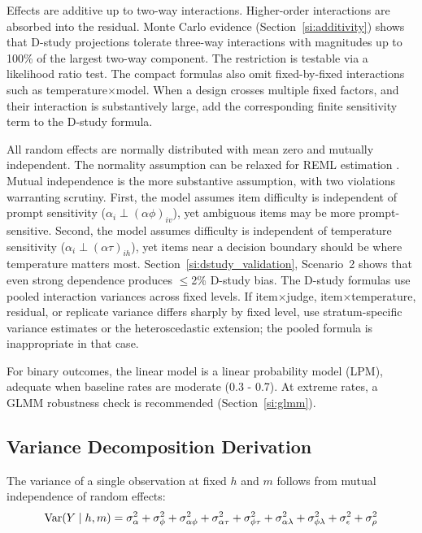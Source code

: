 \begin{assumption}
\label{asn:additivity}
Effects are additive up to two-way interactions. Higher-order interactions are absorbed into the residual. Monte Carlo evidence (Section~\ref{si:additivity}) shows that D-study projections tolerate three-way interactions with magnitudes up to 100\% of the largest two-way component. The restriction is testable via a likelihood ratio test.
The compact formulas also omit fixed-by-fixed interactions such as temperature$\times$model. When a design crosses multiple fixed factors, and their interaction is substantively large, add the corresponding finite sensitivity term to the D-study formula.
\end{assumption}

\begin{assumption}
\label{asn:normality}
All random effects are normally distributed with mean zero and mutually independent. The normality assumption can be relaxed for REML estimation \citep{jiang1996reml}. Mutual independence is the more substantive assumption, with two violations warranting scrutiny. First, the model assumes item difficulty is independent of prompt sensitivity ($\alpha_i \perp (\alpha\phi)_{iv}$), yet ambiguous items may be more prompt-sensitive. Second, the model assumes difficulty is independent of temperature sensitivity ($\alpha_i \perp (\alpha\tau)_{ih}$), yet items near a decision boundary should be where temperature matters most. Section~\ref{si:dstudy_validation}, Scenario~2 shows that even strong dependence produces $\leq$2\% D-study bias.
The D-study formulas use pooled interaction variances across fixed levels. If item$\times$judge, item$\times$temperature, residual, or replicate variance differs sharply by fixed level, use stratum-specific variance estimates or the heteroscedastic extension; the pooled formula is inappropriate in that case.

For binary outcomes, the linear model is a linear probability model (LPM), adequate when baseline rates are moderate (0.3 - 0.7). At extreme rates, a GLMM robustness check is recommended (Section~\ref{si:glmm}).
\end{assumption}

\subsection{Variance Decomposition Derivation}

The variance of a single observation at fixed $h$ and $m$ follows from mutual independence of random effects:
\begin{equation}
\operatorname{Var}(Y \mid h, m) = \sigma^2_\alpha + \sigma^2_\phi + \sigma^2_{\alpha\phi} + \sigma^2_{\alpha\tau} + \sigma^2_{\phi\tau} + \sigma^2_{\alpha\lambda} + \sigma^2_{\phi\lambda} + \sigma^2_\epsilon + \sigma^2_\rho
\end{equation}

